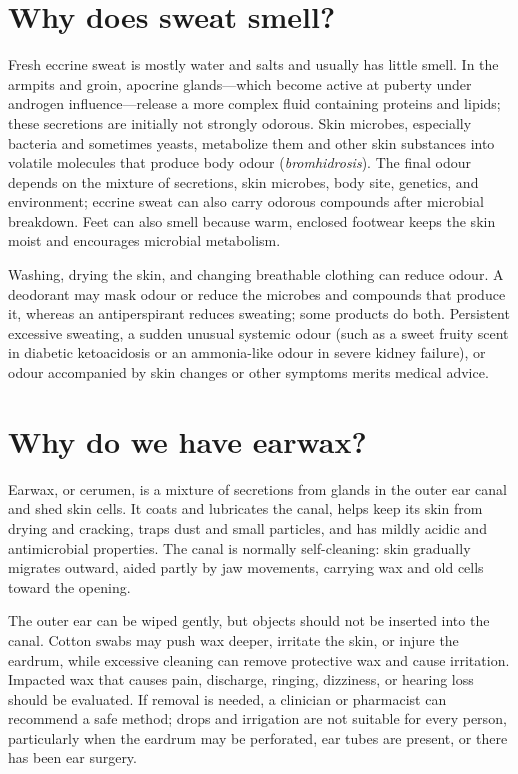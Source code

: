 \documentclass[11pt,oneside]{report}
\begin{document}
\section{Why does sweat smell?}

Fresh eccrine sweat is mostly water and salts and usually has little smell. In
the armpits and groin, apocrine glands—which become active at puberty under
androgen influence—release a more complex fluid containing proteins and lipids;
these secretions are initially not strongly odorous. Skin microbes, especially
bacteria and sometimes yeasts, metabolize them and other skin substances into
volatile molecules that produce body odour (\emph{bromhidrosis}). The final odour
depends on the mixture of secretions, skin microbes, body site, genetics, and
environment; eccrine sweat can also carry odorous compounds after microbial
breakdown. Feet can also
smell because warm, enclosed footwear keeps the skin moist and encourages
microbial metabolism.

Washing, drying the skin, and changing breathable clothing can reduce odour. A
deodorant may mask odour or reduce the microbes and compounds that produce it,
whereas an antiperspirant reduces sweating; some products do both. Persistent
excessive sweating, a sudden unusual systemic odour (such as a sweet fruity
scent in diabetic ketoacidosis or an ammonia-like odour in severe kidney
failure), or odour accompanied by skin changes or other symptoms merits medical
advice.

\section{Why do we have earwax?}

Earwax, or cerumen, is a mixture of secretions from glands in the outer ear
canal and shed skin cells. It coats and lubricates the canal, helps keep its
skin from drying and cracking, traps dust and small particles, and has mildly
acidic and antimicrobial properties. The canal is normally self-cleaning:
skin gradually migrates outward, aided partly by jaw movements, carrying wax
and old cells toward the opening.

The outer ear can be wiped gently, but objects should not be inserted into the
canal. Cotton swabs may push wax deeper, irritate the skin, or injure the
eardrum, while excessive cleaning can remove protective wax and cause irritation.
Impacted wax that causes pain, discharge, ringing, dizziness, or hearing loss
should be evaluated. If removal is needed, a clinician or pharmacist can
recommend a safe method; drops and irrigation are not suitable for every person,
particularly when the eardrum may be perforated, ear tubes are present, or there
has been ear surgery.
\end{document}
